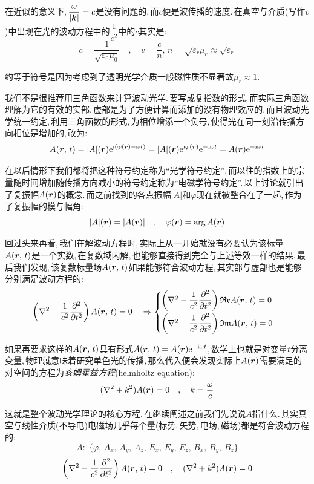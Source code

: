 在近似的意义下,\,$\dfrac{\omega}{|\boldsymbol{k}|}=c$是没有问题的.\,而$c$便是波传播的速度.\,在真空与介质(写作$v$)中出现在光的波动方程中的$\dfrac{1}{c^2}$中的$c$其实是:
\[c=\frac{1}{\sqrt{\varepsilon_0\mu_0}}\quad ,\quad v=\frac{c}{n},\,n=\sqrt{\varepsilon_r\mu_r}\approx \sqrt{\varepsilon_r}\]

约等于符号是因为考虑到了透明光学介质一般磁性质不显著故$\mu_r\approx 1$.

我们不是很推荐用三角函数来计算波动光学.\,要写成复指数的形式,\,而实际三角函数理解为它的有效的实部,\,虚部是为了方便计算而添加的没有物理效应的.\,而且波动光学统一约定,\,利用三角函数的形式,\,为相位增添一个负号,\,使得光在同一刻沿传播方向相位是增加的,\,改为:
\[A(\boldsymbol{r},\,t)=|A|(\boldsymbol{r}){\rm e}^{{\rm i}(\varphi(\boldsymbol{r})-\omega t)}=|A|(\boldsymbol{r}){\rm e}^{{\rm i}\varphi(\boldsymbol{r})}{\rm e}^{-{\rm i}\omega t}=A(\boldsymbol{r}){\rm e}^{-{\rm i}\omega t}\]

在以后情形下我们都将把这种符号约定称为``光学符号约定'',\,而以往的指数上的宗量随时间增加随传播方向减小的符号约定称为``电磁学符号约定''.\,以上讨论就引出了复振幅$A(\boldsymbol{r})$的概念.\,而之前找到的各点振幅$|A|$和$\varphi$现在就被整合在了一起,\,作为了复振幅的模与幅角:
\[|A|(\boldsymbol{r})=|A(\boldsymbol{r})|\quad ,\quad \varphi(\boldsymbol{r})=\arg A(\boldsymbol{r})\]

回过头来再看,\,我们在解波动方程时,\,实际上从一开始就没有必要认为该标量$A(\boldsymbol{r},\,t)$是一个实数,\,在复数域内解,\,也能够直接得到完全与上述等效一样的结果.\,最后我们发现,\,该复数标量场$A(\boldsymbol{r},\,t)$如果能够符合波动方程,\,其实部与虚部也是能够分别满足波动方程的:
\[\left(\nabla^2 -\frac{1}{c^2}\frac{\partial^2}{\partial t^2}\right)A(\boldsymbol{r},\,t)=0\quad \Rightarrow \begin{cases}\left(\nabla^2 -\dfrac{1}{c^2}\dfrac{\partial^2}{\partial t^2}\right)\mathfrak{Re} A(\boldsymbol{r},\,t)=0 \\[8pt] \left(\nabla^2 -\dfrac{1}{c^2}\dfrac{\partial^2}{\partial t^2}\right)\mathfrak{Im}A(\boldsymbol{r},\,t)=0\end{cases}\]

如果再要求这样的$A(\boldsymbol{r},\,t)$具有形式$A(\boldsymbol{r},\,t)=A(\boldsymbol{r}){\rm e}^{-{\rm i}\omega t}$,\,数学上也就是对变量$t$分离变量,\,物理就意味着研究单色光的传播,\,那么代入便会发现实际上$A(\boldsymbol{r})$需要满足的对空间的方程为\emph{亥姆霍兹方程}(helmholtz equation):
\[(\nabla^2+k^2)A(\boldsymbol{r})=0\quad ,\quad k=\frac{\omega}{c}\]

这就是整个波动光学理论的核心方程.\,在继续阐述之前我们先说说$A$指什么.\,其实真空与线性介质(不导电)电磁场几乎每个量(标势,\,矢势,\,电场,\,磁场)都是符合波动方程的:
\[A:\;\{\varphi,\, A_x,\,A_y,\,A_z,\,E_x,\,E_y,\,E_z,\,B_x,\,B_y,\,B_z\}\]
\[\left(\nabla^2 -\frac{1}{c^2}\frac{\partial^2}{\partial t^2}\right)A(\boldsymbol{r},\,t)=0\quad,\quad (\nabla^2+k^2)A(\boldsymbol{r})=0\]

